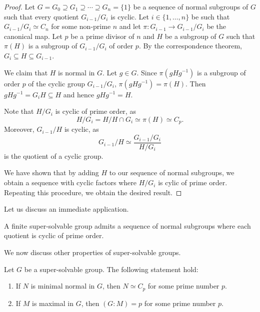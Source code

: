 \begin{proof}
Let $G=G_0\supseteq G_1\supseteq\cdots\supseteq G_n=\{1\}$ be a sequence of normal subgroups
of $G$ such that every quotient $G_{i-1}/G_i$ is cyclic. Let 
$i\in\{1,\dots,n\}$ be such that $G_{i-1}/G_i\simeq C_n$ for some non-prime  
$n$ and let $\pi\colon G_{i-1}\to G_{i-1}/G_i$ be the canonical map. 
Let $p$ be a prime divisor of $n$ and $H$ be a subgroup of $G$ such that 
$\pi(H)$ is a subgroup of $G_{i-1}/G_i$ of order $p$. By the correspondence theorem, 
$G_{i}\subseteq H\subseteq G_{i-1}$. 

We claim that $H$ is normal in $G$. Let $g\in G$. Since $\pi(gHg^{-1})$ is a subgroup of order $p$ of 
the cyclic group $G_{i-1}/G_i$, $\pi(gHg^{-1})=\pi(H)$. Then 
$gHg^{-1}=G_{i}H\subseteq H$ and hence $gHg^{-1}=H$. 

Note that $H/G_i$ is cyclic of prime order, as 
\[
H/G_i=H/H\cap G_i\simeq \pi(H)\simeq C_p. 
\]
Moreover, $G_{i-1}/H$ is cyclic, as 
\[
G_{i-1}/H\simeq\frac{G_{i-1}/G_i}{H/G_i}
\]
is the quotient of a cyclic group. 
	
We have shown that by adding $H$ to our sequence of normal subgroups, 
we obtain a sequence with cyclic factors where 
$H/G_{i}$ is cylic of prime order. Repeating this procedure, we obtain the desired result. 
\end{proof}

Let us discuss an immediate application. 

\begin{corollary}
A finite super-solvable group admits a sequence 
of normal subgroups where each quotient is cyclic of prime order. 
\end{corollary}


We now discuss other properties of super-solvable groups. 

\begin{theorem}
\label{thm:super_structure}
Let $G$ be a super-solvable group. The following statement hold:  
\begin{enumerate}
\item If $N$ is minimal normal in $G$, then $N\simeq C_p$ for some prime number $p$.
\item If $M$ is maximal in $G$, then $(G:M)=p$ for some prime number $p$.
\end{enumerate}
\end{theorem}

